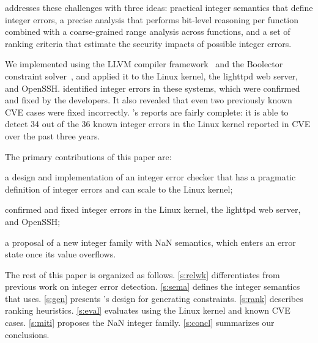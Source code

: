 \sys addresses these challenges with three ideas:
practical integer semantics that define integer errors,
a precise analysis that performs bit-level reasoning per function
combined with a coarse-grained range analysis across functions,
and a set of ranking criteria that estimate the security impacts
of possible integer errors.

We implemented \sys using the LLVM compiler framework~\cite{lattner:llvm}
and the Boolector constraint solver~\cite{boolector}, and applied it
to the Linux kernel, the lighttpd web server, and OpenSSH\@.  \sys
identified \nrbugs integer errors in these systems, which were
confirmed and fixed by the developers.  It also revealed that even
two previously known CVE cases were fixed incorrectly.
\sys's reports are fairly complete: it is able to detect 34 out of the
36 known integer errors in the Linux kernel reported in CVE over the past
three years.

%

The primary contributions of this paper are:
\begin{CompactItemize}
\item a design and implementation of an integer error checker that has a 
  pragmatic definition of integer errors and can scale to the Linux kernel;
\item \nrbugs confirmed and fixed integer errors in
  the Linux kernel, the lighttpd web server, and OpenSSH;
\item a proposal of a new integer family with NaN semantics, which
  enters an error state once its value overflows. 
\end{CompactItemize}

The rest of this paper is organized as follows.
\autoref{s:relwk} differentiates \sys from previous work on integer 
error detection. \autoref{s:sema}
defines the integer semantics that \sys uses.  \autoref{s:gen}
presents \sys's design for generating constraints.  \autoref{s:rank}
describes ranking heuristics.  \autoref{s:eval} evaluates \sys using
the Linux kernel and known CVE cases.
\autoref{s:miti} proposes the NaN integer family.
\autoref{s:concl} summarizes our conclusions.
